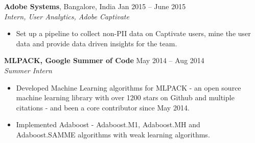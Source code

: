 \documentclass[letterpaper]{article}
\begin{document}
\vspace{-0.5mm}
\textbf{Adobe Systems}, Bangalore, India \hfill Jan 2015 -- June 2015\\
\emph{Intern, User Analytics, Adobe Captivate}\\
\vspace{-6mm}
\begin{itemize}
\item Set up a pipeline to collect non-PII data on Captivate users, mine the user data and provide data driven insights for the team.
\end{itemize}

\vspace{-0.6mm}

\textbf{MLPACK, Google Summer of Code} \hfill May 2014 -- Aug 2014\\
\emph{Summer Intern}\\
\vspace{-6mm}
\begin{itemize}
\item Developed Machine Learning algorithms for MLPACK - an open source machine learning library with over 1200 stars on Github and multiple citations - and been a core contributor since May 2014.
\vspace{-2mm}
\item Implemented Adaboost - Adaboost.M1, Adaboost.MH and Adaboost.SAMME algorithms with weak learning algorithms.
\end{itemize}
\vspace{-1mm}
\end{document}
